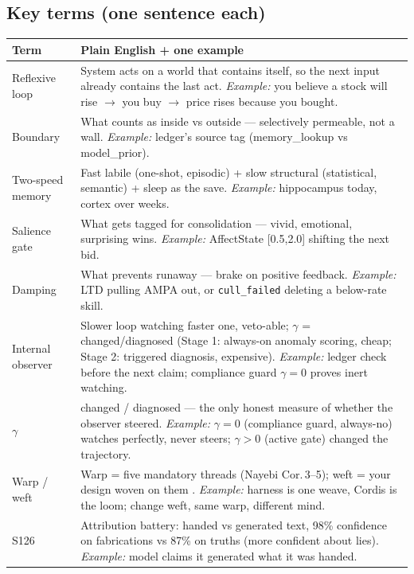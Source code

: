 \documentclass[11pt]{article}
\begin{document}
\subsection*{Key terms (one sentence each)}

\begin{center}
\setlength{\tabcolsep}{3pt}
\small
\begin{tabular}{p{3.0cm}p{9.05cm}}
\toprule
Term & Plain English + one example \\
\midrule
Reflexive loop & System acts on a world that contains itself, so the next input already contains the last act. \emph{Example:} you believe a stock will rise $\to$\allowbreak{} you buy $\to$\allowbreak{} price rises because you bought. \\
Boundary & What counts as inside vs outside --- selectively permeable, not a wall. \emph{Example:} ledger's source tag (memory\_lookup vs model\_prior). \\
Two-speed memory & Fast labile (one-shot, episodic) + slow structural (statistical, semantic) + sleep as the save. \emph{Example:} hippocampus today, cortex over weeks. \\
Salience gate & What gets tagged for consolidation --- vivid, emotional, surprising wins. \emph{Example:} AffectState [0.5,2.0] shifting the next bid. \\
Damping & What prevents runaway --- brake on positive feedback. \emph{Example:} LTD pulling AMPA out, or \texttt{cull\_failed} deleting a below-rate skill. \\
Internal observer & Slower loop watching faster one, veto-able; $\gamma$ = changed/diagnosed (Stage 1: always-on anomaly scoring, cheap; Stage 2: triggered diagnosis, expensive). \emph{Example:} ledger check before the next claim; compliance guard $\gamma=0$ proves inert watching. \\
$\gamma$ & changed / diagnosed --- the only honest measure of whether the observer steered. \emph{Example:} $\gamma=0$ (compliance guard, always-no) watches perfectly, never steers; $\gamma>0$ (active gate) changed the trajectory. \\
Warp / weft & Warp = five mandatory threads (Nayebi Cor.\,3--5); weft = your design woven on them \citep{nayebi2026}. \emph{Example:} harness is one weave, Cordis is the loom; change weft, same warp, different mind. \\
S126 & Attribution battery: handed vs generated text, 98\% confidence on fabrications vs 87\% on truths (more confident about lies). \emph{Example:} model claims it generated what it was handed. \\

\end{tabular}
\end{center}
\end{document}
